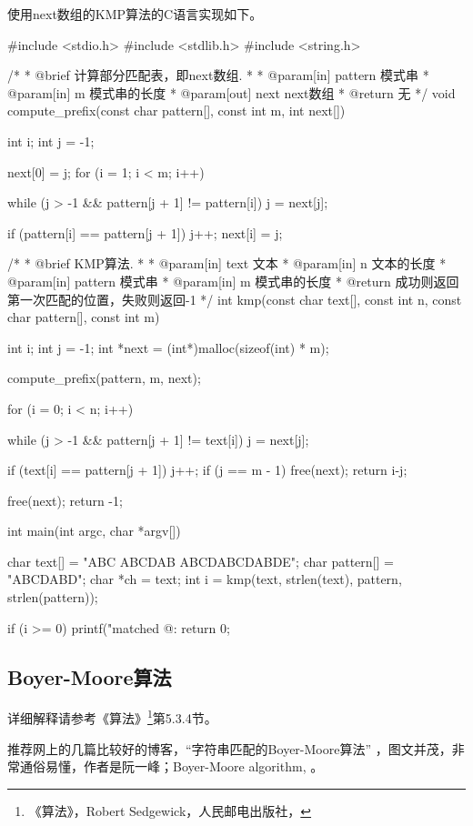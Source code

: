 使用next数组的KMP算法的C语言实现如下。
\begin{Codex}[label=kmp.c]
#include <stdio.h>
#include <stdlib.h>
#include <string.h>

/*
 * @brief 计算部分匹配表，即next数组.
 *
 * @param[in] pattern 模式串
 * @param[in] m 模式串的长度
 * @param[out] next next数组
 * @return 无
 */
void compute_prefix(const char pattern[], const int m, int next[]) {
    int i;
    int j = -1;

    next[0] = j;
    for (i = 1; i < m; i++) {
        while (j > -1 && pattern[j + 1] != pattern[i]) j = next[j];

        if (pattern[i] == pattern[j + 1]) j++;
        next[i] = j;
    }
}

/*
 * @brief KMP算法.
 *
 * @param[in] text 文本
 * @param[in] n 文本的长度
 * @param[in] pattern 模式串
 * @param[in] m 模式串的长度
 * @return 成功则返回第一次匹配的位置，失败则返回-1
 */
int kmp(const char text[], const int n, const char pattern[], const int m) {
    int i;
    int j = -1;
    int *next = (int*)malloc(sizeof(int) * m);

    compute_prefix(pattern, m, next);

    for (i = 0; i < n; i++) {
        while (j > -1 && pattern[j + 1] != text[i]) j = next[j];

        if (text[i] == pattern[j + 1]) j++;
        if (j == m - 1) {
            free(next);
            return i-j;
        }
    }

    free(next);
    return -1;
}


int main(int argc, char *argv[]) {
    char text[] = "ABC ABCDAB ABCDABCDABDE";
    char pattern[] = "ABCDABD";
    char *ch = text;
    int i = kmp(text, strlen(text), pattern, strlen(pattern));

    if (i >= 0) printf("matched @: %
    return 0;
}
\end{Codex}


\subsection{Boyer-Moore算法}
详细解释请参考《算法》\footnote{《算法》，Robert Sedgewick，人民邮电出版社，}第5.3.4节。

推荐网上的几篇比较好的博客，“字符串匹配的Boyer-Moore算法” ，图文并茂，非常通俗易懂，作者是阮一峰；Boyer-Moore algorithm, 。

